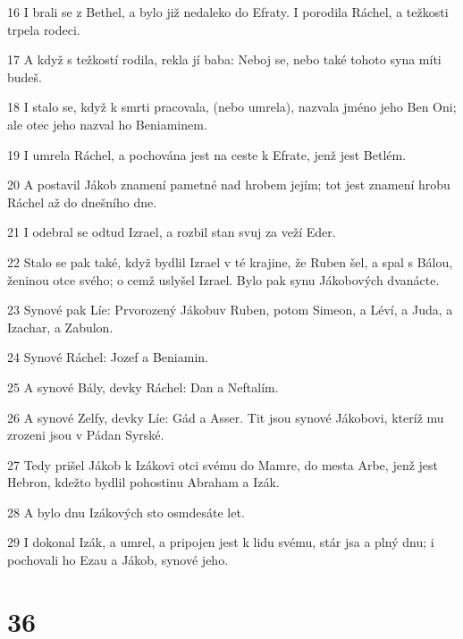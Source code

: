 \par 16 I brali se z Bethel, a bylo již nedaleko do Efraty. I porodila Ráchel, a težkosti trpela rodeci.
\par 17 A když s težkostí rodila, rekla jí baba: Neboj se, nebo také tohoto syna míti budeš.
\par 18 I stalo se, když k smrti pracovala, (nebo umrela), nazvala jméno jeho Ben Oni; ale otec jeho nazval ho Beniaminem.
\par 19 I umrela Ráchel, a pochována jest na ceste k Efrate, jenž jest Betlém.
\par 20 A postavil Jákob znamení pametné nad hrobem jejím; tot jest znamení hrobu Ráchel až do dnešního dne.
\par 21 I odebral se odtud Izrael, a rozbil stan svuj za veží Eder.
\par 22 Stalo se pak také, když bydlil Izrael v té krajine, že Ruben šel, a spal s Bálou, ženinou otce svého; o cemž uslyšel Izrael. Bylo pak synu Jákobových dvanácte.
\par 23 Synové pak Líe: Prvorozený Jákobuv Ruben, potom Simeon, a Léví, a Juda, a Izachar, a Zabulon.
\par 24 Synové Ráchel: Jozef a Beniamin.
\par 25 A synové Bály, devky Ráchel: Dan a Neftalím.
\par 26 A synové Zelfy, devky Líe: Gád a Asser. Tit jsou synové Jákobovi, kteríž mu zrozeni jsou v Pádan Syrské.
\par 27 Tedy prišel Jákob k Izákovi otci svému do Mamre, do mesta Arbe, jenž jest Hebron, kdežto bydlil pohostinu Abraham a Izák.
\par 28 A bylo dnu Izákových sto osmdesáte let.
\par 29 I dokonal Izák, a umrel, a pripojen jest k lidu svému, stár jsa a plný dnu; i pochovali ho Ezau a Jákob, synové jeho.

\chapter{36}

